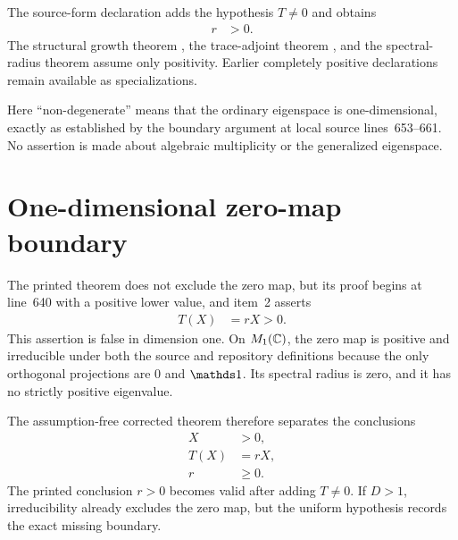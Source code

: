 \documentclass[11pt]{article}
\begin{document}
The source-form declaration
 adds the
hypothesis $T\neq0$ and obtains
\begin{align}
  r
    &>0.
  \label{eq:wolf_thm6_3_positive_map_cp_scope_positive_radius}
\end{align}
The structural growth theorem , the
trace-adjoint theorem , and the
spectral-radius theorem
 assume only
positivity. Earlier completely positive declarations remain available as
specializations.

Here ``non-degenerate'' means that the ordinary eigenspace is
one-dimensional, exactly as established by the boundary argument at local
source lines~653--661. No assertion is made about algebraic multiplicity or
the generalized eigenspace.

\section{One-dimensional zero-map boundary}

The printed theorem does not exclude the zero map, but its proof begins at
line~640 with a positive lower value, and item~2 asserts
\begin{align}
  T(X)
    &=rX>0.
  \label{eq:wolf_thm6_3_positive_map_cp_scope_printed_positive_image}
\end{align}
This assertion is false in dimension one. On $M_{1}(\mathbb{C})$, the zero map is positive
and irreducible under both the source and repository definitions because the
only orthogonal projections are $0$ and $\Id$. Its spectral radius is zero,
and it has no strictly positive eigenvalue.

The assumption-free corrected theorem therefore separates the conclusions
\begin{align}
  X
    &>0,
  \label{eq:wolf_thm6_3_positive_map_cp_scope_corrected_positive_vector}\\
  T(X)
    &=rX,
  \label{eq:wolf_thm6_3_positive_map_cp_scope_corrected_eigenvector}\\
  r
    &\geq0.
  \label{eq:wolf_thm6_3_positive_map_cp_scope_corrected_nonnegative_radius}
\end{align}
The printed conclusion $r>0$ becomes valid after adding $T\neq0$. If $D>1$,
irreducibility already excludes the zero map, but the uniform hypothesis
records the exact missing boundary.
\end{document}
